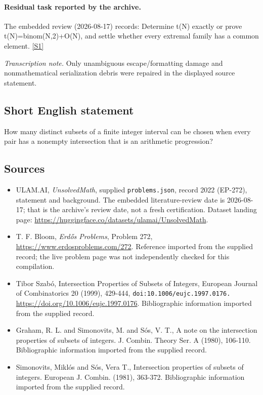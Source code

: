 \documentclass[11pt,a4paper]{article}
\newcommand{\sref}[2]{\hyperlink{source:#1:#2}{[S#2]}}
\begin{document}
\paragraph{Residual task reported by the archive.}

The embedded review (2026-08-17) records: Determine t(N) exactly or prove t(N)=binom(N,2)+O(N), and settle whether every extremal family has a common element. \sref{2022}{1}

{\small\emph{Transcription note.} Only unambiguous escape/formatting damage and nonmathematical serialization debris were repaired in the displayed source statement.}

\subsection{Short English statement}

How many distinct subsets of a finite integer interval can be chosen when every pair has a nonempty intersection that is an arithmetic progression?

\subsection{Sources}

{\small

\begin{itemize}

\item[\hypertarget{source:2022:1}{S1}] ULAM.AI, \emph{UnsolvedMath}, supplied \texttt{problems.json}, record 2022 (EP-272), statement and background. The embedded literature-review date is 2026-08-17; that is the archive’s review date, not a fresh certification. Dataset landing page: \url{https://huggingface.co/datasets/ulamai/UnsolvedMath}.

\item[\hypertarget{source:2022:2}{S2}] T. F. Bloom, \emph{Erdős Problems}, Problem 272, \url{https://www.erdosproblems.com/272}. Reference imported from the supplied record; the live problem page was not independently checked for this compilation.

\item[\hypertarget{source:2022:3}{S3}] Tibor Szabó, Intersection Properties of Subsets of Integers, European Journal of Combinatorics 20 (1999), 429-444, \nolinkurl{doi:10.1006/eujc.1997.0176.} \url{https://doi.org/10.1006/eujc.1997.0176}. Bibliographic information imported from the supplied record.

\item[\hypertarget{source:2022:4}{S4}] Graham, R. L. and Simonovits, M. and S\'{o}s, V. T., A note on the intersection properties of subsets of integers. J. Combin. Theory Ser. A (1980), 106-110. Bibliographic information imported from the supplied record.

\item[\hypertarget{source:2022:5}{S5}] Simonovits, Mikl\'{o}s and S\'{o}s, Vera T., Intersection properties of subsets of integers. European J. Combin. (1981), 363-372. Bibliographic information imported from the supplied record.

\end{itemize}

}

\label{end:2022}
\end{document}
